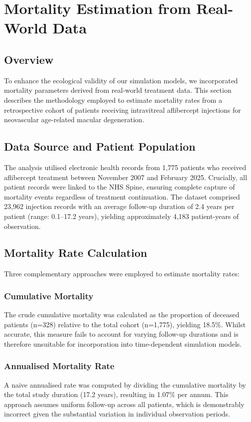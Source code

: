 \section{Mortality Estimation from Real-World Data}

\subsection{Overview}
To enhance the ecological validity of our simulation models, we incorporated mortality parameters derived from real-world treatment data. This section describes the methodology employed to estimate mortality rates from a retrospective cohort of patients receiving intravitreal aflibercept injections for neovascular age-related macular degeneration.

\subsection{Data Source and Patient Population}
The analysis utilised electronic health records from 1,775 patients who received aflibercept treatment between November 2007 and February 2025. Crucially, all patient records were linked to the NHS Spine, ensuring complete capture of mortality events regardless of treatment continuation. The dataset comprised 23,962 injection records with an average follow-up duration of 2.4 years per patient (range: 0.1--17.2 years), yielding approximately 4,183 patient-years of observation.

\subsection{Mortality Rate Calculation}
Three complementary approaches were employed to estimate mortality rates:

\subsubsection{Cumulative Mortality}
The crude cumulative mortality was calculated as the proportion of deceased patients (n=328) relative to the total cohort (n=1,775), yielding 18.5\%. Whilst accurate, this measure fails to account for varying follow-up durations and is therefore unsuitable for incorporation into time-dependent simulation models.

\subsubsection{Annualised Mortality Rate}
A naive annualised rate was computed by dividing the cumulative mortality by the total study duration (17.2 years), resulting in 1.07\% per annum. This approach assumes uniform follow-up across all patients, which is demonstrably incorrect given the substantial variation in individual observation periods.

